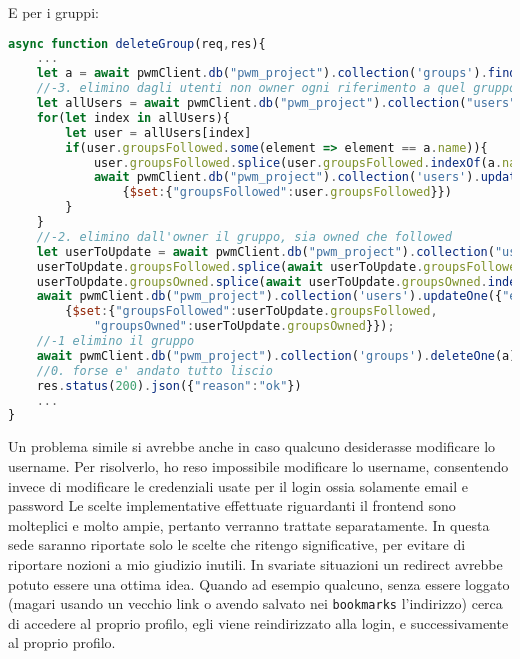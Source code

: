 E per i gruppi:
\begin{lstlisting}[language=JavaScript]
async function deleteGroup(req,res){
    ...
    let a = await pwmClient.db("pwm_project").collection('groups').findOne({"name": validator.escape(req.params.name)})
    //-3. elimino dagli utenti non owner ogni riferimento a quel gruppo
    let allUsers = await pwmClient.db("pwm_project").collection("users").find({"email":{$ne: decoded.email}}).toArray()
    for(let index in allUsers){
        let user = allUsers[index]
        if(user.groupsFollowed.some(element => element == a.name)){
            user.groupsFollowed.splice(user.groupsFollowed.indexOf(a.name),1)
            await pwmClient.db("pwm_project").collection('users').updateOne({"email":user.email},
                {$set:{"groupsFollowed":user.groupsFollowed}})
        }
    }
    //-2. elimino dall'owner il gruppo, sia owned che followed
    let userToUpdate = await pwmClient.db("pwm_project").collection("users").findOne({"email":decoded.email})
    userToUpdate.groupsFollowed.splice(await userToUpdate.groupsFollowed.indexOf(a.name),1)
    userToUpdate.groupsOwned.splice(await userToUpdate.groupsOwned.indexOf(a.name),1)
    await pwmClient.db("pwm_project").collection('users').updateOne({"email":decoded.email},
        {$set:{"groupsFollowed":userToUpdate.groupsFollowed,
            "groupsOwned":userToUpdate.groupsOwned}});
    //-1 elimino il gruppo
    await pwmClient.db("pwm_project").collection('groups').deleteOne(a)
    //0. forse e' andato tutto liscio
    res.status(200).json({"reason":"ok"})
    ...
}
\end{lstlisting}
\alert{Un problema simile si avrebbe anche in caso qualcuno desiderasse modificare lo username. Per risolverlo, ho reso impossibile modificare lo username, consentendo invece di modificare le credenziali usate per il login ossia solamente email e password}
Le scelte implementative effettuate riguardanti il frontend sono molteplici e molto ampie, pertanto verranno trattate separatamente. In questa sede saranno riportate solo le scelte che ritengo significative, per evitare di riportare nozioni a mio giudizio inutili.
In svariate situazioni un redirect avrebbe potuto essere una ottima idea. Quando ad esempio qualcuno, senza essere loggato (magari usando un vecchio link o avendo salvato nei \verb|bookmarks| l'indirizzo) cerca di accedere al proprio profilo, egli viene reindirizzato alla login, e successivamente al proprio profilo.

